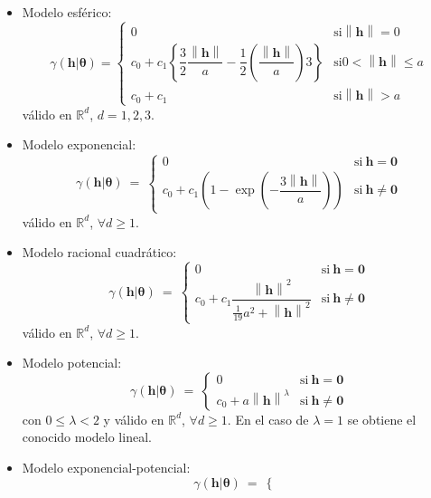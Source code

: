 \documentclass[
  spanish,
]{book}
\theoremstyle{break}
\theoremstyle{definition}
\theoremstyle{definition}
\theoremstyle{definition}
\theoremstyle{definition}
\theoremstyle{remark}
\begin{document}
\begin{itemize}
\item
  Modelo esférico:
  \[\gamma(\mathbf{h}\left| \boldsymbol{\theta}\right. ) = \left\{ 
  \begin{array}{ll}
  0 & \text{si} \left\| \mathbf{h}\right\| =0 \\
  c_{0} +c_1 \left\{ \dfrac{3}{2} \dfrac{\left\| \mathbf{h}\right\| }{a}
  -\dfrac{1}{2} \left( \dfrac{\left\| \mathbf{h}\right\| }{a} \right)
  3\right\}  & \text{si} 0<\left\| \mathbf{h}\right\| \leq a \\
  c_{0} +c_1  & \text{si} \left\| \mathbf{h}\right\| >a
  \end{array}
  \right.\]
  válido en \(\mathbb{R}^{d}\), \(d=1,2,3\).
\item
  Modelo exponencial:
  \[\gamma(\mathbf{h}\left| \boldsymbol{\theta}\right. )\ =\ \left\{ 
  \begin{array}{ll}
  0 & \text{si}\  \mathbf{h}=\mathbf{0} \\
  c_{0} + c_1 \left( 1-\exp \left( -\dfrac{3\left\|
  \mathbf{h}\right\| }{a} \right) \right)  & \text{si}\  \mathbf{h}\neq
  \mathbf{0}
  \end{array}
  \right.\]
  válido en \(\mathbb{R}^{d}\), \(\forall d \geq 1\).
\item
  Modelo racional cuadrático:
  \[\gamma(\mathbf{h}\left| \boldsymbol{\theta}\right. )\ =\ \left\{ 
  \begin{array}{ll}
  0 & \text{si}\  \mathbf{h}=\mathbf{0} \\
  c_{0} + c_1 \dfrac{\left\| \mathbf{h}\right\|^2
  }{\frac{1}{19} a^2 +\left\| \mathbf{h}\right\|^2 }  & \text{si}\ 
  \mathbf{h}\neq \mathbf{0}
  \end{array}
  \right.\]
  válido en \(\mathbb{R}^{d}\), \(\forall d \geq 1\).
\item
  Modelo potencial:
  \[\gamma(\mathbf{h}\left| \boldsymbol{\theta}\right. )\ =\ \left\{ 
  \begin{array}{ll}
  0 & \text{si}\  \mathbf{h}=\mathbf{0} \\
  c_{0} + a\left\| \mathbf{h}\right\|^{\lambda }  & \text{si}\ 
  \mathbf{h}\neq \mathbf{0}
  \end{array}
  \right.\]
  con \(0\leq \lambda <2\) y válido en \(\mathbb{R}^{d}\), \(\forall d \geq 1\).
  En el caso de \(\lambda =1\) se obtiene el conocido modelo lineal.
\item
  Modelo exponencial-potencial:
  \[\gamma(\mathbf{h}\left| \boldsymbol{\theta}\right. )\ =\ \left\{ 
  \begin{array}{ll}

\end{array}\]
\end{itemize}
\end{document}
